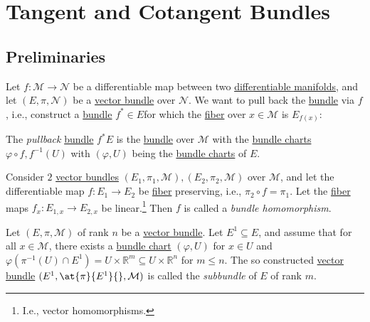 \section{Tangent and Cotangent Bundles}
\subsection{Preliminaries}
Let \(f\colon \mathcal{M} \to \mathcal{N} \) be a differentiable map between two \hyperref[def:smooth-manifold]{differentiable manifolds}, and let \((E, \pi , \mathcal{N} )\)  be a \hyperref[def:vector-bundle]{vector bundle} over \(\mathcal{N} \). We want to pull back the \hyperref[def:vector-bundle]{bundle} via \(f\), i.e., construct a \hyperref[def:vector-bundle]{bundle} \(f^{\ast} \in E\)for which the \hyperref[not:fiber]{fiber} over \(x\in \mathcal{M} \) is \(E_{f(x)}\):

\begin{definition}[Pullback]\label{def:pullback}
	The \emph{pullback} \hyperref[def:vector-bundle]{bundle} \(f^{\ast} E\) is the \hyperref[def:vector-bundle]{bundle} over \(\mathcal{M} \) with the \hyperref[def:bundle-chart]{bundle charts} \(\varphi \circ f, f^{-1} (U)\) with \((\varphi , U)\) being the \hyperref[def:bundle-chart]{bundle charts} of \(E\).
\end{definition}

\begin{definition}\label{def:bundle-homomorphism}
	Consider \(2\) \hyperref[def:vector-bundle]{vector bundles} \((E_1, \pi _1, \mathcal{M} ), (E_2, \pi _2, \mathcal{M} )\) over \(\mathcal{M} \), and let the differentiable map \(f\colon E_1 \to E_2\) be \hyperref[not:fiber]{fiber} preserving, i.e., \(\pi _2 \circ f = \pi _1\). Let the \hyperref[not:fiber]{fiber} maps \(f_x \colon E_{1,x} \to E_{2,x}\) be linear.\footnote{I.e., vector homomorphisms.} Then \(f\) is called a \emph{bundle homomorphism}.
\end{definition}

\begin{definition}[Subbundle]\label{def:subbundle}
	Let \((E, \pi , \mathcal{M} )\) of rank \(n\) be a \hyperref[def:vector-bundle]{vector bundle}. Let \(E^1 \subseteq E\), and assume that for all \(x\in \mathcal{M} \), there exists a \hyperref[def:bundle-chart]{bundle chart} \((\varphi , U)\) for \(x\in U\) and \(\varphi (\pi ^{-1} (U) \cap E^1) = U \times \mathbb{R} ^m \subseteq U \times \mathbb{R} ^n\) for \(m \leq n\). The so constructed \hyperref[def:vector-bundle]{vector bundle} \((E^1, \at{\pi }{E^1}{}, \mathcal{M} )\) is called the \emph{subbundle} of \(E\) of rank \(m\).
\end{definition}

